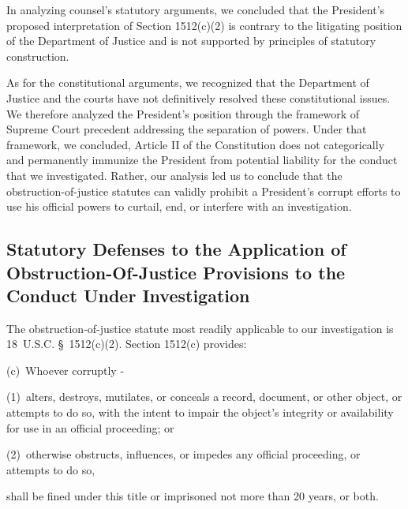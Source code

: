 In analyzing counsel's statutory arguments, we concluded that the President's proposed interpretation of Section 1512(c)(2) is contrary to the litigating position of the Department of Justice and is not supported by principles of statutory construction.

As for the constitutional arguments, we recognized that the Department of Justice and the courts have not definitively resolved these constitutional issues.
We therefore analyzed the President's position through the framework of Supreme Court precedent addressing the separation of powers.
Under that framework, we concluded, Article II of the Constitution does not categorically and permanently immunize the President from potential liability for the conduct that we investigated.
Rather, our analysis led us to conclude that the obstruction-of-justice statutes can validly prohibit a President's corrupt efforts to use his official powers to curtail, end, or interfere with an investigation.

\subsection{Statutory Defenses to the Application of Obstruction-Of-Justice Provisions to the Conduct Under Investigation}

The obstruction-of-justice statute most readily applicable to our investigation is 18~U.S.C. \S~1512(c)(2). Section 1512(c) provides:

(c)~Whoever corruptly -

(1)~alters, destroys, mutilates, or conceals a record, document, or other object, or attempts to do so, with the intent to impair the object's integrity or availability for use in an official proceeding; or

(2)~otherwise obstructs, influences, or impedes any official proceeding, or attempts to do so,

shall be fined under this title or imprisoned not more than 20 years, or both.

